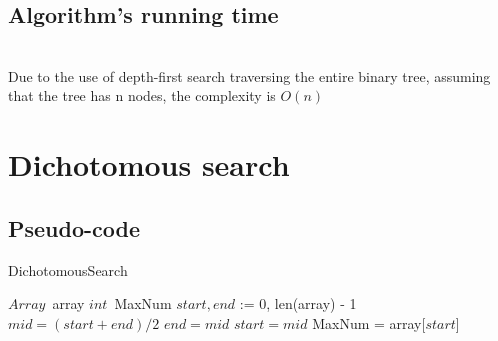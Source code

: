 \documentclass{article}
\begin{document}
\subsection{Algorithm's running time}\\
Due to the use of depth-first search traversing the entire binary tree, assuming that the tree has n nodes, the complexity is $O(n)$

\clearpage
\section{Dichotomous search}
\subsection{Pseudo-code}
\begin{algorithm}
    \caption{DichotomousSearch}
    \begin{algorithmic}[1] 
        \Require $Array$\ array
        \Ensure $int$\ MaxNum
            \State $start, end$ := 0, len(array) - 1
                \State $mid = (start + end) / 2$
                    \State $end = mid$
                \Else
                    \State $start = mid$
                \EndIf
            \EndWhile
            \State MaxNum = array[$start$]
            \State {}
        \EndFunction
        
    \end{algorithmic}  
\end{algorithm} 
\clearpage
\end{document}
